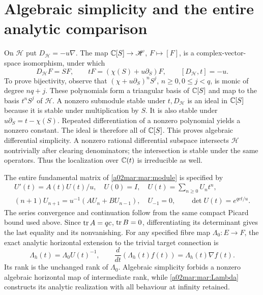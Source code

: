 \section{Algebraic simplicity and the entire analytic comparison}
On $\mathscr H$ put $D_{\mathscr H}=-u\nabla$. The map
$\mathbb C[S]\to\mathscr H$, $F\mapsto[F]$, is a complex-vector-space
isomorphism, under which
\begin{equation}\tag{MAR17}\label{a02mar:mar:weyl}
 D_{\mathscr H}F=SF,\qquad
 tF=(\chi(S)+u\partial_S)F,
 \qquad[D_{\mathscr H},t]=-u.
\end{equation}
To prove bijectivity, observe that
$(\chi+u\partial_S)^nS^j$, $n\ge0,0\le j<q$, is monic of degree
$nq+j$. These polynomials form a triangular basis of $\mathbb C[S]$
and map to the basis $t^nS^j$ of $\mathscr H$.
A nonzero submodule stable under $t,D_{\mathscr H}$ is an ideal
in $\mathbb C[S]$ because it is stable under multiplication by $S$.
It is also stable under $u\partial_S=t-\chi(S)$.
Repeated differentiation of a nonzero polynomial yields a nonzero
constant. The ideal is therefore all of $\mathbb C[S]$. This proves
algebraic differential simplicity. A nonzero rational differential
subspace intersects $\mathscr H$ nontrivially after clearing
denominators; the intersection is stable under the same operators.
Thus the localization over $\mathbb C(t)$ is irreducible as well.

The entire fundamental matrix of \eqref{a02mar:mar:module} is specified by
\begin{equation}\tag{MAR18}\label{a02mar:mar:U}
 \begin{gathered}
 U'(t)=A(t)U(t)/u,\quad U(0)=I,\quad
 U(t)=\sum_{n\ge0}U_nt^n,\\
 (n+1)U_{n+1}=u^{-1}(AU_n+BU_{n-1}),\quad U_{-1}=0,
 \qquad\det U(t)=e^{qct/u}.
 \end{gathered}
\end{equation}
The series convergence and continuation follow from the same compact
Picard bound used above. Since $\operatorname{tr} A=qc$, $\operatorname{tr} B=0$, differentiating
its determinant gives the last equality and its nonvanishing.
For any specified fibre map $\Lambda_0:E\to F$, the exact analytic
horizontal extension to the trivial target connection is
\begin{equation}\tag{MAR19}\label{a02mar:mar:Lambda}
 \Lambda_h(t)=\Lambda_0U(t)^{-1},\qquad
 \frac{d}{dt}(\Lambda_h(t)f(t))=\Lambda_h(t)\nabla f(t).
\end{equation}
Its rank is the unchanged rank of $\Lambda_0$. Algebraic simplicity
forbids a nonzero algebraic horizontal map of intermediate rank,
while \eqref{a02mar:mar:Lambda} constructs its analytic realization with
all behaviour at infinity retained.


